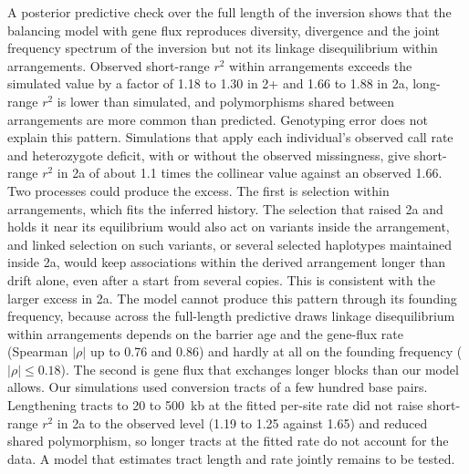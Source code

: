\documentclass[11pt]{article}
\begin{document}
A posterior predictive check over the full length of the inversion shows that the balancing model with gene flux reproduces diversity, divergence and the joint frequency spectrum of the inversion but not its linkage disequilibrium within arrangements. Observed short-range $r^2$ within arrangements exceeds the simulated value by a factor of 1.18 to 1.30 in 2+ and 1.66 to 1.88 in 2a, long-range $r^2$ is lower than simulated, and polymorphisms shared between arrangements are more common than predicted. Genotyping error does not explain this pattern. Simulations that apply each individual's observed call rate and heterozygote deficit, with or without the observed missingness, give short-range $r^2$ in 2a of about 1.1 times the collinear value against an observed 1.66. Two processes could produce the excess. The first is selection within arrangements, which fits the inferred history. The selection that raised 2a and holds it near its equilibrium would also act on variants inside the arrangement, and linked selection on such variants, or several selected haplotypes maintained inside 2a, would keep associations within the derived arrangement longer than drift alone, even after a start from several copies. This is consistent with the larger excess in 2a. The model cannot produce this pattern through its founding frequency, because across the full-length predictive draws linkage disequilibrium within arrangements depends on the barrier age and the gene-flux rate (Spearman $|\rho|$ up to 0.76 and 0.86) and hardly at all on the founding frequency ($|\rho|\le0.18$). The second is gene flux that exchanges longer blocks than our model allows. Our simulations used conversion tracts of a few hundred base pairs. Lengthening tracts to 20 to 500~kb at the fitted per-site rate did not raise short-range $r^2$ in 2a to the observed level (1.19 to 1.25 against 1.65) and reduced shared polymorphism, so longer tracts at the fitted rate do not account for the data. A model that estimates tract length and rate jointly remains to be tested.
\end{document}
